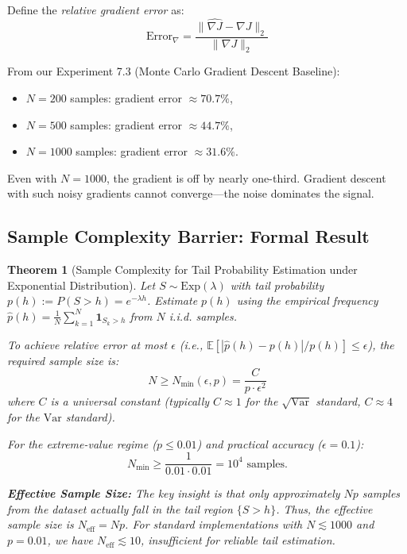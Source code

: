 \documentclass[12pt]{article}
\newtheorem{theorem}{Theorem}[section]
\theoremstyle{definition}
\begin{document}
Define the \emph{relative gradient error} as:
\[
\text{Error}_{\nabla} = \frac{\|\widehat{\nabla J} - \nabla J\|_2}{\|\nabla J\|_2}
\]

From our Experiment 7.3 (Monte Carlo Gradient Descent Baseline):
\begin{itemize}
    \item $N=200$ samples: gradient error $\approx 70.7\%$,
    \item $N=500$ samples: gradient error $\approx 44.7\%$,
    \item $N=1000$ samples: gradient error $\approx 31.6\%$.
\end{itemize}

Even with $N=1000$, the gradient is off by nearly one-third. Gradient descent with such noisy gradients cannot converge---the noise dominates the signal.

\subsection{Sample Complexity Barrier: Formal Result}

\begin{theorem}[Sample Complexity for Tail Probability Estimation under Exponential Distribution]
\label{thm:tail_sample_complexity}
Let $S \sim \text{Exp}(\lambda)$ with tail probability $p(h) := P(S > h) = e^{-\lambda h}$. Estimate $p(h)$ using the empirical frequency $\hat{p}(h) = \frac{1}{N}\sum_{k=1}^N \mathbf{1}_{S_k > h}$ from $N$ i.i.d. samples.

To achieve relative error at most $\epsilon$ (i.e., $\mathbb{E}[|\hat{p}(h) - p(h)|/p(h)] \leq \epsilon$), the required sample size is:
\[
N \geq N_{\min}(\epsilon, p) = \frac{C}{p \cdot \epsilon^2}
\]
where $C$ is a universal constant (typically $C \approx 1$ for the $\sqrt{\text{Var}}$ standard, $C \approx 4$ for the $\text{Var}$ standard).

For the extreme-value regime ($p \leq 0.01$) and practical accuracy ($\epsilon = 0.1$):
\[
N_{\min} \geq \frac{1}{0.01 \cdot 0.01} = 10^4 \text{ samples}.
\]

\noindent\textbf{Effective Sample Size:} The key insight is that only approximately $Np$ samples from the dataset actually fall in the tail region $\{S > h\}$. Thus, the effective sample size is $N_{\text{eff}} = Np$. For standard implementations with $N \lesssim 1000$ and $p = 0.01$, we have $N_{\text{eff}} \lesssim 10$, insufficient for reliable tail estimation.
\end{theorem}
\end{document}
